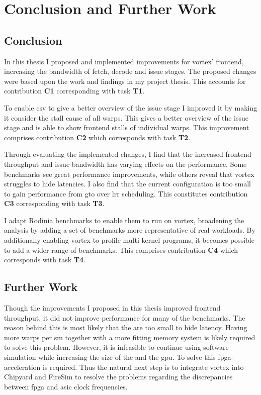 \chapter{Conclusion and Further Work}

\section{Conclusion}

In this thesis I proposed and implemented improvements for \Gls{vortex}' frontend, increasing the bandwidth of fetch, decode and issue stages. The proposed changes were based upon the work and findings in my project thesis. This accounts for contribution \textbf{C1} corresponding with task \textbf{T1}.

To enable \acrshort{csv} to give a better overview of the issue stage I improved it by making it consider the stall cause of all warps. This gives a better overview of the issue stage and is able to show frontend stalls of individual warps. This improvement comprises contribution \textbf{C2} which corresponds with task \textbf{T2}. 

Through evaluating the implemented changes, I find that the increased frontend throughput and issue bandwidth has varying effects on the performance. Some benchmarks see great performance improvements, while others reveal that \Gls{vortex} struggles to hide latencies. I also find that the current configuration is too small to gain performance from \acrshort{gto} over \acrshort{lrr} scheduling. This constitutes contribution \textbf{C3} corresponding with task \textbf{T3}.

I adapt Rodinia benchmarks to enable them to run on \Gls{vortex}, broadening the analysis by adding a set of benchmarks more representative of real workloads. By additionally enabling \Gls{vortex} to profile multi-kernel programs, it becomes possible to add a wider range of benchmarks. This comprises contribution \textbf{C4} which corresponds with task \textbf{T4}.

\section{Further Work}

Though the improvements I proposed in this thesis improved frontend throughput, it did not improve performance for many of the benchmarks. The reason behind this is most likely that the  are too small to hide latency. Having more warps per \acrshort{sm} together with a more fitting memory system is likely required to solve this problem. However, it is infeasible to continue using software simulation while increasing the size of the  and the \acrshort{gpu}. To solve this \acrshort{fpga}-acceleration is required. Thus the natural next step is to integrate \Gls{vortex} into Chipyard and FireSim to resolve the problems regarding the discrepancies between \acrshort{fpga} and \acrshort{asic} clock frequencies.

